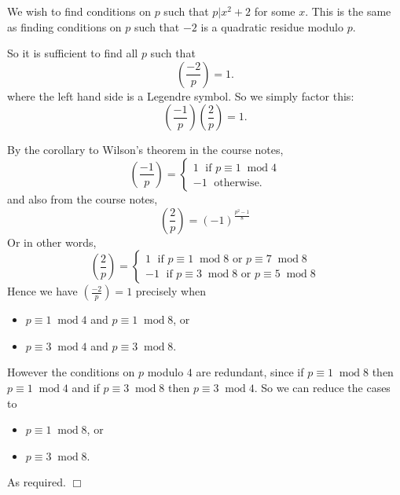 \documentclass[10pt]{article}
\newenvironment{proof}[1][Proof]{\begin{trivlist}
\item[\hskip \labelsep {\bfseries #1}]}{\end{trivlist}}
\newcommand{\modulo}[1]{\;\operatorname{mod} #1}
\newcommand{\legendre}[2]{\left(\frac{#1}{#2}\right)}
\begin{document}
\begin{proof}
    We wish to find conditions on $p$
    such that $p|x^2+2$ for some $x$. This
    is the same as finding conditions on $p$ such that $-2$
    is a quadratic residue modulo $p$.
    
    So it is sufficient to find all $p$ such that
    \begin{equation*}
        \legendre{-2}{p} = 1.
    \end{equation*}
    where the left hand side is a Legendre symbol.
    So we simply factor this:
    \begin{equation*}
        \legendre{-1}{p}\legendre{2}{p} = 1.
    \end{equation*}
    
    By the corollary to Wilson's theorem
    in the course notes,
    \begin{equation*}
        \legendre{-1}{p} = \begin{cases}
            1\;\text{ if }p\equiv 1\modulo 4\\
            -1\;\text{ otherwise.}
        \end{cases}
    \end{equation*} 
    and also from the course notes,
    \begin{equation*}
        \legendre{2}{p} = (-1)^{\frac{p^2-1}{8}}
    \end{equation*}
    Or in other words,
    \begin{equation*}
        \legendre{2}{p} = \begin{cases}
            1\;\text{ if }p\equiv 1\modulo{8}\text{ or }p\equiv 7\modulo{8}\\
            -1\;\text{ if }p\equiv 3\modulo{8}\text{ or }p\equiv 5\modulo{8}        
        \end{cases}
    \end{equation*}
    Hence we have $\legendre{-2}{p} = 1$ precisely when
    \begin{itemize}
        \item{} $p\equiv 1\modulo{4}$ and $p\equiv 1\modulo{8}$, or
        \item{} $p\equiv 3\modulo{4}$ and $p\equiv 3\modulo{8}$.
    \end{itemize}
    However the conditions on $p$ modulo $4$ are redundant, since if $p\equiv 1\modulo{8}$
    then $p\equiv 1\modulo{4}$
    and if $p\equiv 3\modulo{8}$ then $p\equiv 3\modulo{4}$.
    So we can reduce the cases to
    \begin{itemize}
        \item{} $p\equiv 1\modulo{8}$, or
        \item{} $p\equiv 3\modulo{8}$.
    \end{itemize}
    As required. $\Box$
\end{proof}
\end{document}
